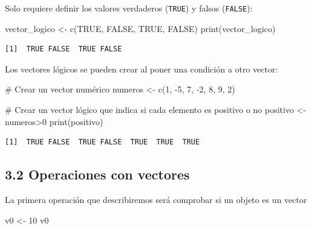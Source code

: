 \documentclass[
  letterpaper,
]{scrbook}
\newenvironment{Shaded}{\begin{snugshade}}{\end{snugshade}}
\newcommand{\CommentTok}[1]{\textcolor[rgb]{0.37,0.37,0.37}{#1}}
\newcommand{\ConstantTok}[1]{\textcolor[rgb]{0.56,0.35,0.01}{#1}}
\newcommand{\DecValTok}[1]{\textcolor[rgb]{0.68,0.00,0.00}{#1}}
\newcommand{\FunctionTok}[1]{\textcolor[rgb]{0.28,0.35,0.67}{#1}}
\newcommand{\NormalTok}[1]{\textcolor[rgb]{0.00,0.23,0.31}{#1}}
\newcommand{\OtherTok}[1]{\textcolor[rgb]{0.00,0.23,0.31}{#1}}
\newcommand{\SpecialCharTok}[1]{\textcolor[rgb]{0.37,0.37,0.37}{#1}}
\begin{document}
Solo requiere definir los valores verdaderos (\texttt{TRUE}) y falsos
(\texttt{FALSE}):

\begin{Shaded}
\begin{Highlighting}[]
\NormalTok{vector\_logico }\OtherTok{\textless{}{-}} \FunctionTok{c}\NormalTok{(}\ConstantTok{TRUE}\NormalTok{, }\ConstantTok{FALSE}\NormalTok{, }\ConstantTok{TRUE}\NormalTok{, }\ConstantTok{FALSE}\NormalTok{)}
\FunctionTok{print}\NormalTok{(vector\_logico)}
\end{Highlighting}
\end{Shaded}

\begin{verbatim}
[1]  TRUE FALSE  TRUE FALSE
\end{verbatim}

Los vectores lógicos se pueden crear al poner una condición a otro
vector:

\begin{Shaded}
\begin{Highlighting}[]
\CommentTok{\# Crear un vector numérico}
\NormalTok{numeros }\OtherTok{\textless{}{-}} \FunctionTok{c}\NormalTok{(}\DecValTok{1}\NormalTok{, }\SpecialCharTok{{-}}\DecValTok{5}\NormalTok{, }\DecValTok{7}\NormalTok{, }\SpecialCharTok{{-}}\DecValTok{2}\NormalTok{, }\DecValTok{8}\NormalTok{, }\DecValTok{9}\NormalTok{, }\DecValTok{2}\NormalTok{)}

\CommentTok{\# Crear un vector lógico que indica si cada elemento es positivo o no}
\NormalTok{positivo }\OtherTok{\textless{}{-}}\NormalTok{ numeros}\SpecialCharTok{\textgreater{}}\DecValTok{0}
\FunctionTok{print}\NormalTok{(positivo)}
\end{Highlighting}
\end{Shaded}

\begin{verbatim}
[1]  TRUE FALSE  TRUE FALSE  TRUE  TRUE  TRUE
\end{verbatim}

\hypertarget{operaciones-con-vectores}{%
\subsection{3.2 Operaciones con
vectores}\label{operaciones-con-vectores}}

La primera operación que describiremos será comprobar si un objeto es un
vector

\begin{Shaded}
\begin{Highlighting}[]
\NormalTok{v0 }\OtherTok{\textless{}{-}} \DecValTok{10}
\NormalTok{v0}
\end{Highlighting}
\end{Shaded}
\end{document}
